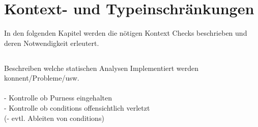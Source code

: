 \section{Kontext- und Typeinschränkungen}
\label{sec:constraints}
In den folgenden Kapitel werden die nötigen Kontext Checks beschrieben und 
deren Notwendigkeit erleutert.

\subsection{}

Beschreiben welche statischen Analysen Implementiert werden konnent/Probleme/usw.\\
\\
- Kontrolle ob Purness eingehalten\\
- Kontrolle ob conditions offensichtlich verletzt\\
(- evtl. Ableiten von conditions)




